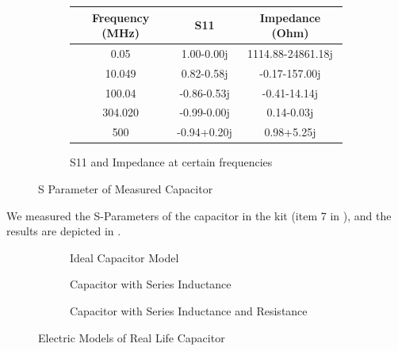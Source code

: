 \documentclass{article}
\begin{document}
\begin{figure}[h]
    \begin{subfigure}{\linewidth}
        \centering
        \begin{tabular}{ |c|c|c| }
            \hline
            Frequency (MHz) & S11         & Impedance (Ohm)
            \\\hline
            0.05            & 1.00-0.00j  & 1114.88-24861.18j
            \\\hline
            10.049          & 0.82-0.58j  & -0.17-157.00j
            \\\hline
            100.04          & -0.86-0.53j & -0.41-14.14j
            \\\hline
            304.020         & -0.99-0.00j & 0.14-0.03j
            \\\hline
            500             & -0.94+0.20j & 0.98+5.25j
            \\\hline
        \end{tabular}
        \caption{S11 and Impedance at certain frequencies}
        \label{tab:capacitor_meas}
    \end{subfigure}

    \caption{S Parameter of Measured Capacitor}
    \label{fig:capacitor_meas}
\end{figure}

We measured the S-Parameters of the capacitor in the kit (item 7 in ), and the results are depicted in .

\begin{figure}
    \centering
    \begin{subfigure}{.5\linewidth}
        \centering
        \caption{Ideal Capacitor Model}
        \label{fig:capacitor_c}
    \end{subfigure}%
    \begin{subfigure}{.5\linewidth}
        \centering
        \caption{Capacitor with Series Inductance}
        \label{fig:capacitor_cl}
    \end{subfigure}%

    \begin{subfigure}{.5\linewidth}
        \centering
        \caption{Capacitor with Series Inductance and Resistance}
        \label{fig:capacitor_clr}
    \end{subfigure}%
    \caption{Electric Models of Real Life Capacitor}
\end{figure}
\end{document}
